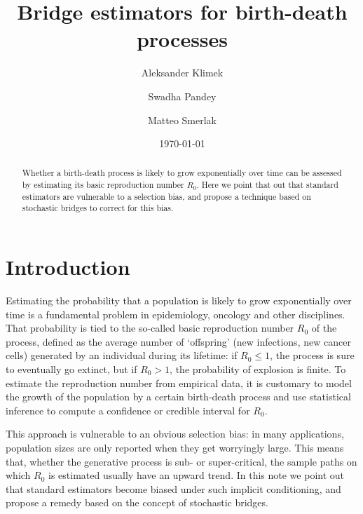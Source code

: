 \documentclass[%
 reprint,
groupedaddress,
 amsmath,amssymb,
 aps,
]{revtex4-2}
\begin{document}
\title{Bridge estimators for birth-death processes}

\author{Aleksander Klimek}
\author{Swadha Pandey}
\author{Matteo Smerlak}


\date{\today}%

\begin{abstract}
Whether a birth-death process is likely to grow exponentially over time can be assessed by estimating its basic reproduction number $R_0$. Here we point that out that standard estimators are vulnerable to a selection bias, and propose a technique based on stochastic bridges to correct for this bias. 
\end{abstract}

\maketitle


\section{Introduction}

Estimating the probability that a population is likely to grow exponentially over time is a fundamental problem in epidemiology, oncology and other disciplines. That probability is tied to the so-called basic reproduction number $R_0$ of the process, defined as the average number of `offspring' (new infections, new cancer cells) generated by an individual during its lifetime: if $R_0 \leq 1$, the process is sure to eventually go extinct, but if $R_0 > 1$, the probability of explosion is finite. To estimate the reproduction number from empirical data, it is customary to model the growth of the population by a certain birth-death process and use statistical inference to compute a confidence or credible interval for $R_0$.  

This approach is vulnerable to an obvious selection bias: in many applications, population sizes are only reported when they get worryingly large. This means that, whether the generative process is sub- or super-critical, the sample paths on which $R_0$ is estimated usually have an upward trend. In this note we point out that standard estimators become biased under such implicit conditioning, and propose a remedy based on the concept of stochastic bridges. 
\end{document}
